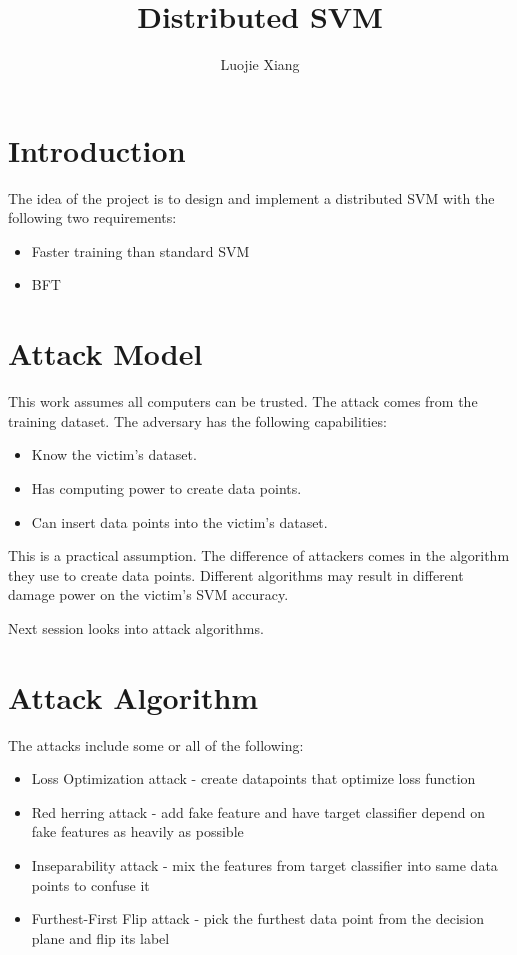 \documentclass[10pt,conference,compsocconf,letterpaper]{IEEEtran}
\title{Distributed SVM}
\author{Luojie Xiang}
\date{}
\begin{document}
\maketitle{}
\section{Introduction}

The idea of the project is to design and implement a distributed SVM with the following two requirements:

\begin{itemize}
\item Faster training than standard SVM
\item BFT
\end{itemize}

\section{Attack Model}

This work assumes all computers can be trusted. The attack comes from the training dataset. The adversary has the following capabilities:

\begin{itemize}
\item Know the victim's dataset. 
\item Has computing power to create data points.
\item Can insert data points into the victim's dataset.
\end{itemize}

This is a practical assumption. The difference of attackers comes in the algorithm they use to create data points. Different algorithms may result in different damage power on the victim's SVM accuracy.

Next session looks into attack algorithms.


\section{Attack Algorithm}

The attacks include some or all of the following:

\begin{itemize}
\item Loss Optimization attack - create datapoints that optimize loss function \cite{biggio12}
\item Red herring attack - add fake feature and have target classifier depend on fake features as heavily as possible \cite{newsome06}
\item Inseparability attack - mix the features from target classifier into same data points to confuse it \cite{newsome06}
\item Furthest-First Flip attack - pick the furthest data point from the decision plane and flip its label \cite{xiao12}
\end{itemize}
\end{document}
